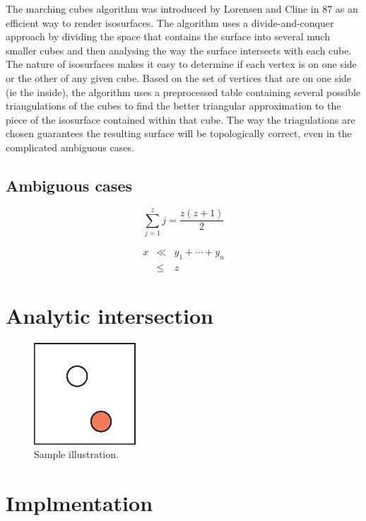 \documentclass[conference]{acmsiggraph}
\begin{document}
The marching cubes algorithm was introduced by Lorensen and Cline in 87 as an efficient way to render isosurfaces. The algorithm uses a divide-and-conquer approach by dividing the space that contains the surface into several much smaller cubes and then analysing the way the surface intersects with each cube. The nature of isosurfaces makes it easy to determine if each vertex is on one side or the other of any given cube. Based on the set of vertices that are on one side (ie the inside), the algorithm uses a preprocessed table containing several possible triangulations of the cubes to find the better triangular approximation to the piece of the isosurface contained within that cube. The way the triagulations are chosen guarantees the resulting surface will be topologically correct, even in the complicated ambiguous cases. 






\subsection{Ambiguous cases}

\begin{equation}
 \sum_{j=1}^{z} j = \frac{z(z+1)}{2}
\end{equation}

\begin{eqnarray}
x & \ll & y_{1} + \cdots + y_{n} \\
  & \leq & z
\end{eqnarray}

\section{Analytic intersection}


\begin{figure}[ht]
  \centering
  \includegraphics[width=1.5in]{images/samplefigure}
  \caption{Sample illustration.}
\end{figure}

\section{Implmentation}
\end{document}
